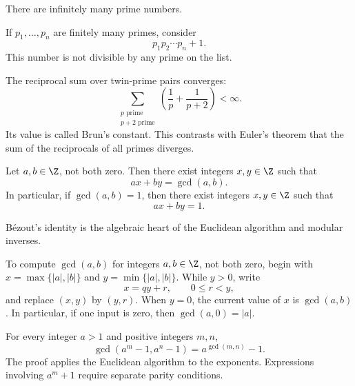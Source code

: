     \begin{theorem}
        There are infinitely many prime numbers.
    \end{theorem}

    \begin{idea}
        If $p_1,\dots,p_n$ are finitely many primes, consider
        \[
            p_1p_2\cdots p_n+1.
        \]
        This number is not divisible by any prime on the list.
    \end{idea}

    \begin{theorem}
        The reciprocal sum over twin-prime pairs converges:
        \[
            \sum_{\substack{p\text{ prime}\\p+2\text{ prime}}}
            \left(\frac{1}{p}+\frac{1}{p+2}\right)
            <\infty.
        \]
        Its value is called Brun's constant. This contrasts with Euler's
        theorem that the sum of the reciprocals of all primes diverges.
    \end{theorem}

    \begin{theorem}
        Let $a,b\in\Z$, not both zero. Then there exist integers $x,y\in\Z$
        such that
        \[
            ax+by=\gcd(a,b).
        \]
        In particular, if $\gcd(a,b)=1$, then there exist integers $x,y\in\Z$
        such that
        \[
            ax+by=1.
        \]
    \end{theorem}

    \begin{remark}
        B\'ezout's identity is the algebraic heart of the Euclidean algorithm and
        modular inverses.
    \end{remark}

    \begin{algorithm}
        To compute $\gcd(a,b)$ for integers $a,b\in\Z$, not both zero, begin
        with $x=\max\{|a|,|b|\}$ and $y=\min\{|a|,|b|\}$. While $y>0$, write
        \[
            x=qy+r,
            \qquad 0\leq r<y,
        \]
        and replace $(x,y)$ by $(y,r)$. When $y=0$, the current value of $x$
        is $\gcd(a,b)$. In particular, if one input is zero, then
        $\gcd(a,0)=|a|$.
    \end{algorithm}

    \begin{theorem}
        For every integer $a>1$ and positive integers $m,n$,
        \[
            \gcd(a^m-1,a^n-1)=a^{\gcd(m,n)}-1.
        \]
        The proof applies the Euclidean algorithm to the exponents.
        Expressions involving $a^m+1$ require separate parity conditions.
    \end{theorem}


